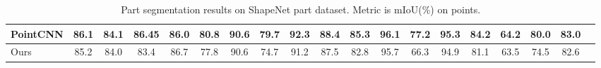 \documentclass[acmtog]{acmart}
\begin{document}
\begin{table*}[t!]
\begin{center}
{\begin{small}
\begin{sc}
\begin{tabular}{l|c|ccccccccccccccccr}
PointCNN & \textbf{86.1} & 84.1 & \textbf{86.45} & 86.0 & \textbf{80.8} & 90.6 & \textbf{79.7} & \textbf{92.3} & \textbf{88.4} & \textbf{85.3} & \textbf{96.1} & \textbf{77.2} & \textbf{95.3} & \textbf{84.2} & \textbf{64.2} & \textbf{80.0} & 83.0 \\
\midrule
Ours                     & 85.2 & 84.0 & 83.4 & 86.7 & 77.8 & 90.6 & 74.7 & 91.2 & 87.5 & 82.8 & 95.7 & 66.3 & 94.9 & 81.1 & 63.5 & 74.5 & 82.6 \\

\bottomrule
\end{tabular}
\end{sc}
\end{small}
}
\end{center}
\caption{Part segmentation results on ShapeNet part dataset. Metric is mIoU(\%) on points.}
\label{table:part_segmentation}
\end{table*}
\end{document}
